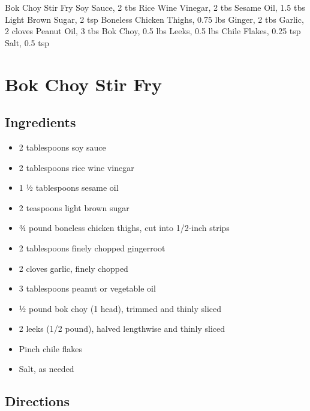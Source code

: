 Bok Choy Stir Fry
  Soy Sauce, 2 tbs
  Rice Wine Vinegar, 2 tbs
  Sesame Oil, 1.5 tbs
  Light Brown Sugar, 2 tsp
  Boneless Chicken Thighs, 0.75 lbs
  Ginger, 2 tbs
  Garlic, 2 cloves
  Peanut Oil, 3 tbs
  Bok Choy, 0.5 lbs
  Leeks, 0.5 lbs
  Chile Flakes, 0.25 tsp
  Salt, 0.5 tsp
\section{ Bok Choy Stir Fry }

\subsection{ Ingredients }

\begin{itemize}
  \item 2 tablespoons soy sauce
  \item 2 tablespoons rice wine vinegar
  \item 1 ½ tablespoons sesame oil
  \item 2 teaspoons light brown sugar
  \item ¾ pound boneless chicken thighs, cut into 1/2-inch strips
  \item 2 tablespoons finely chopped gingerroot
  \item 2 cloves garlic, finely chopped
  \item 3 tablespoons peanut or vegetable oil
  \item ½ pound bok choy (1 head), trimmed and thinly sliced
  \item 2 leeks (1/2 pound), halved lengthwise and thinly sliced
  \item Pinch chile flakes
  \item Salt, as needed

\end{itemize}

\subsection{ Directions }

